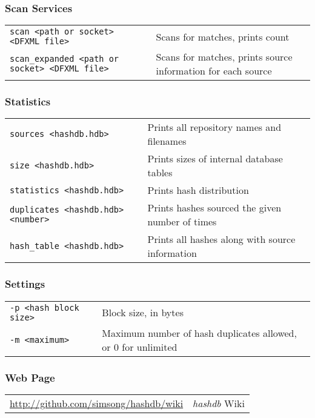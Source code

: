 \documentclass[12pt]{article}
\newcommand{\hdb}{\emph{hashdb}\xspace}
\begin{document}
\subsubsection*{Scan Services}
\begin{tabular}{p{8 cm} p{9 cm} }
\texttt{scan <path or socket> <DFXML file>} & Scans for matches, prints count\\
\texttt{scan\_expanded <path or socket> <DFXML file>} & Scans for matches, prints source information for each source \\
\end{tabular}

\subsubsection*{Statistics}
\begin{tabular}{p{8 cm} p{9 cm} }
\texttt{sources <hashdb.hdb>} & Prints all repository names and filenames \\
\texttt{size <hashdb.hdb>} & Prints sizes of internal database tables \\
\texttt{statistics <hashdb.hdb>} & Prints hash distribution \\
\texttt{duplicates <hashdb.hdb> <number>} & Prints hashes sourced the given number of times \\
\texttt{hash\_table <hashdb.hdb>} & Prints all hashes along with source information\\
\end{tabular}

\subsubsection*{Settings}
\begin{tabular}{p{8 cm} p{9 cm} }
\texttt{-p <hash block size>} & Block size, in bytes \\
\texttt{-m <maximum>} & Maximum number of hash duplicates allowed, or 0 for unlimited\\
\end{tabular}

\subsubsection*{Web Page}
\begin{tabular}{p{8 cm} p{9 cm} }
\url{http://github.com/simsong/hashdb/wiki} & \hdb Wiki \\
\end{tabular}
\end{document}
